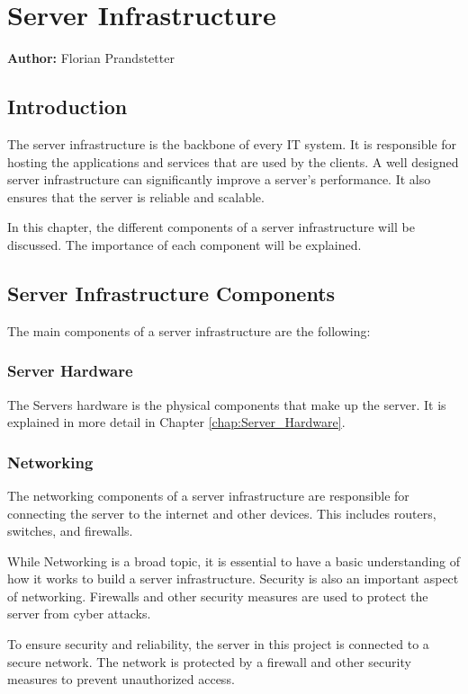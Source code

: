 \chapter{Server Infrastructure}
\label{chap:Server_Infrastructure}
\textbf{Author:} Florian Prandstetter


\section{Introduction}

The server infrastructure is the backbone of every IT system. It is responsible for hosting the applications and services that are used by the clients.
A well designed server infrastructure can significantly improve a server's performance. It also ensures that the server is reliable and scalable.

In this chapter, the different components of a server infrastructure will be discussed. The importance of each component will be explained.

\section{Server Infrastructure Components}

The main components of a server infrastructure are the following:

\subsection{Server Hardware}

The Servers hardware is the physical components that make up the server. 
It is explained in more detail in Chapter \ref{chap:Server_Hardware}.

\subsection{Networking}

The networking components of a server infrastructure are responsible for connecting the server to the internet and other devices.
This includes routers, switches, and firewalls.

While Networking is a broad topic, it is essential to have a basic understanding of how it works to build a server infrastructure.
Security is also an important aspect of networking. Firewalls and other security measures are used to protect the server from cyber attacks.   

To ensure security and reliability, the server in this project is connected to a secure network. The network is protected by a firewall and other security measures to prevent unauthorized access.

